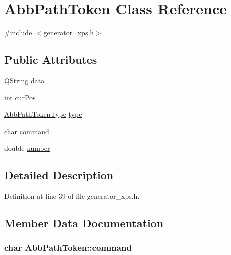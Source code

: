 \hypertarget{classAbbPathToken}{\section{Abb\+Path\+Token Class Reference}
\label{classAbbPathToken}
}


{\ttfamily \#include $<$generator\+\_\+xps.\+h$>$}

\subsection*{Public Attributes}
\begin{DoxyCompactItemize}
\item 
Q\+String \hyperlink{classAbbPathToken_afae0f01c1cab7ae50d1c3c6cefce8e4e}{data}
\item 
int \hyperlink{classAbbPathToken_adac8070c96e4b0270a2d7263a82a31f0}{cur\+Pos}
\item 
\hyperlink{generator__xps_8h_a22ddb6476329df318f1b00ff5d530fab}{Abb\+Path\+Token\+Type} \hyperlink{classAbbPathToken_ae7c9fc519b1171a67b0dc99d07f2570b}{type}
\item 
char \hyperlink{classAbbPathToken_a4bf78d22cde3499681a2e6679f7d6996}{command}
\item 
double \hyperlink{classAbbPathToken_a81ab3e9b8b12aea3ac25d0ce1ac71b8e}{number}
\end{DoxyCompactItemize}


\subsection{Detailed Description}


Definition at line 39 of file generator\+\_\+xps.\+h.



\subsection{Member Data Documentation}
\hypertarget{classAbbPathToken_a4bf78d22cde3499681a2e6679f7d6996}{
\subsubsection[{command}]{\setlength{\rightskip}{0pt plus 5cm}char Abb\+Path\+Token\+::command}}\label{classAbbPathToken_a4bf78d22cde3499681a2e6679f7d6996}


